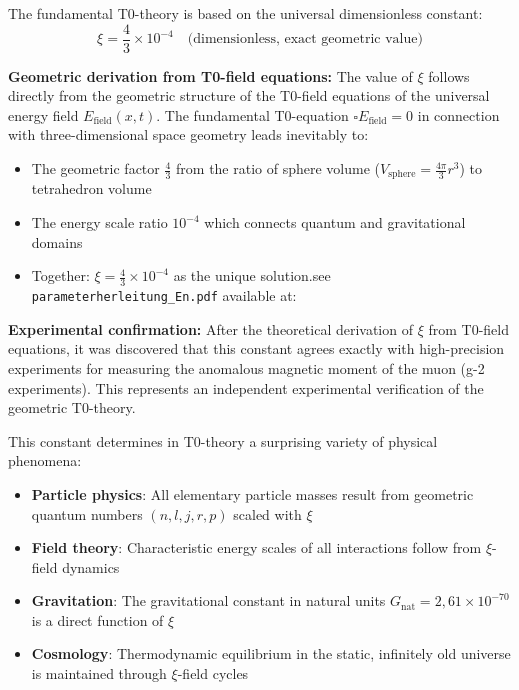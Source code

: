\documentclass[12pt,a4paper]{report}
\begin{document}
	The fundamental T0-theory is based on the universal dimensionless constant:
	\begin{equation}
		\xi = \frac{4}{3} \times 10^{-4} \quad \text{(dimensionless, exact geometric value)}
	\end{equation}
	
	\textbf{Geometric derivation from T0-field equations:} The value of $\xi$ follows directly from the geometric structure of the T0-field equations of the universal energy field $E_{\text{field}}(x,t)$. The fundamental T0-equation $\square E_{\text{field}} = 0$ in connection with three-dimensional space geometry leads inevitably to:
	\begin{itemize}
		\item The geometric factor $\frac{4}{3}$ from the ratio of sphere volume ($V_{\text{sphere}} = \frac{4\pi}{3}r^3$) to tetrahedron volume
		\item The energy scale ratio $10^{-4}$ which connects quantum and gravitational domains
		\item Together: $\xi = \frac{4}{3} \times 10^{-4}$ as the unique solution.see \texttt{parameterherleitung\_En.pdf} available at:
		
	\end{itemize}
	
	\textbf{Experimental confirmation:} After the theoretical derivation of $\xi$ from T0-field equations, it was discovered that this constant agrees exactly with high-precision experiments for measuring the anomalous magnetic moment of the muon (g-2 experiments). This represents an independent experimental verification of the geometric T0-theory.
	
	This constant determines in T0-theory a surprising variety of physical phenomena:
	\begin{itemize}
		\item \textbf{Particle physics}: All elementary particle masses result from geometric quantum numbers $(n,l,j,r,p)$ scaled with $\xi$
		\item \textbf{Field theory}: Characteristic energy scales of all interactions follow from $\xi$-field dynamics
		\item \textbf{Gravitation}: The gravitational constant in natural units $G_{\text{nat}} = 2{,}61 \times 10^{-70}$ is a direct function of $\xi$
		\item \textbf{Cosmology}: Thermodynamic equilibrium in the static, infinitely old universe is maintained through $\xi$-field cycles
	\end{itemize}
	
\end{document}
